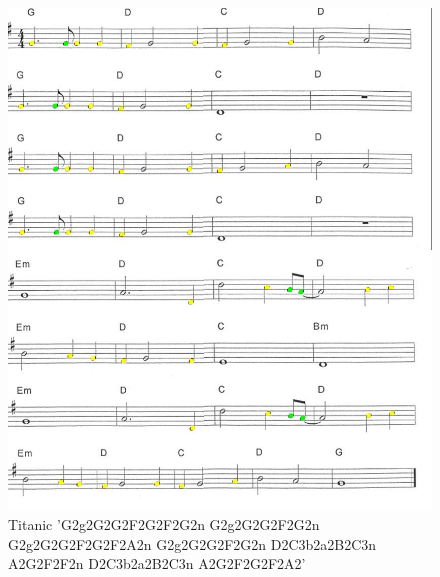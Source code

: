 \begin{figure}[Htb]
    \centering
		\includegraphics[width=\textwidth]{im6s_compare.jpg}
		\caption[Titanic]{Titanic \newline
										 'G2g2G2G2F2G2F2G2n\newline
											G2g2G2G2F2G2n\newline 
											G2g2G2G2F2G2F2A2n\newline
											G2g2G2G2F2G2n\newline
											D2C3b2a2B2C3n\newline
											A2G2F2F2n\newline 
											D2C3b2a2B2C3n\newline 
											A2G2F2G2F2A2'}
\end{figure}

